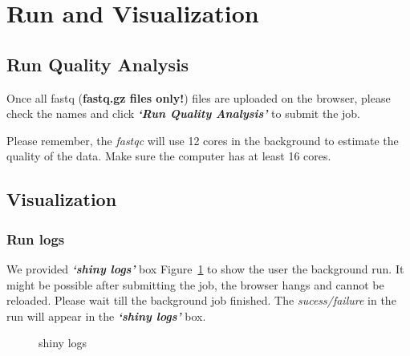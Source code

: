 \documentclass[
  a4paper,
  DIV=11,
  numbers=noendperiod,
  oneside,
  open=any]{scrreport}
\begin{document}
\section{Run and Visualization}\label{run-and-visualization}

\subsection{Run Quality Analysis}\label{run-quality-analysis}

Once all fastq (\textbf{fastq.gz files only!}) files are uploaded on the
browser, please check the names and click \textbf{\emph{`Run Quality
Analysis'}} to submit the job.

\begin{tcolorbox}[enhanced jigsaw, coltitle=black, colback=white, title=\textcolor{quarto-callout-important-color}{\faExclamation}\hspace{0.5em}{Important}, leftrule=.75mm, titlerule=0mm, colframe=quarto-callout-important-color-frame, toprule=.15mm, opacityback=0, arc=.35mm, breakable, rightrule=.15mm, colbacktitle=quarto-callout-important-color!10!white, bottomtitle=1mm, opacitybacktitle=0.6, left=2mm, bottomrule=.15mm, toptitle=1mm]

Please remember, the \emph{fastqc} will use 12 cores in the background
to estimate the quality of the data. Make sure the computer has at least
16 cores.

\end{tcolorbox}

\subsection{Visualization}\label{visualization}

\subsubsection{Run logs}\label{run-logs}

We provided \textbf{\emph{`shiny logs'}} box Figure~\ref{fig-qual4} to
show the user the background run. It might be possible after submitting
the job, the browser hangs and cannot be reloaded. Please wait till the
background job finished. The \emph{sucess/failure} in the run will
appear in the \textbf{\emph{`shiny logs'}} box.

\begin{figure}[H]


\caption{\label{fig-qual4}shiny logs}

\end{figure}%
\end{document}
